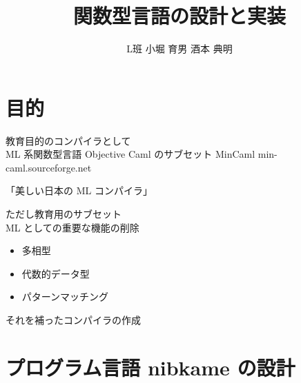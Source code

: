 \documentclass[papersize,30pt,slide]{jsarticle}
\begin{document}
\title{関数型言語の設計と実装}
\author{L班  小堀 育男  酒本 典明}
\date{}
\maketitle

\tableofcontents

\section{目的}
教育目的のコンパイラとして \\
ML 系関数型言語 Objective Caml のサブセット MinCaml min-caml.sourceforge.net

「美しい日本の ML コンパイラ」

ただし教育用のサブセット \\
ML としての重要な機能の削除
\begin{itemize}
\item 多相型
\item 代数的データ型
\item パターンマッチング
\end{itemize}

それを補ったコンパイラの作成

\section{プログラム言語 nibkame の設計}
\end{document}
